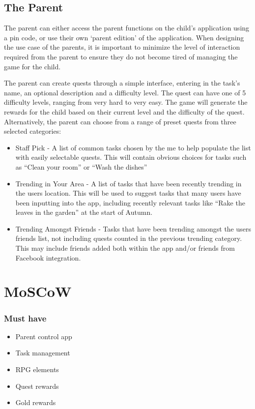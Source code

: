 \subsection{The Parent}
The parent can either access the parent functions on the child's application using a pin code, or use their own `parent edition' of the application. 
When designing the use case of the parents, it is important to minimize the level of interaction required from the parent to ensure they do not become tired of managing the game for the child.

The parent can create quests through a simple interface, entering in the task's name, an optional description and a difficulty level. 
The quest can have one of 5 difficulty levels, ranging from very hard to very easy.
The game will generate the rewards for the child based on their current level and the difficulty of the quest.
Alternatively, the parent can choose from a range of preset quests from three selected categories:
\begin{itemize}
	\item 
		Staff Pick - A list of common tasks chosen by the me to help populate the list with easily selectable quests. 
		This will contain obvious choices for tasks such as ``Clean your room'' or ``Wash the dishes''
	\item
		Trending in Your Area - A list of tasks that have been recently trending in the users location. 
		This will be used to suggest tasks that many users have been inputting into the app, including recently relevant tasks like ``Rake the leaves in the garden'' at the start of Autumn.
	\item 
		Trending Amongst Friends - Tasks that have been trending amongst the users friends list, not including quests counted in the previous 	trending category. 
		This may include friends added both within the app and/or friends from Facebook integration.  
\end{itemize}

\section{MoSCoW}

\subsubsection{Must have}
\begin{itemize}
	\item Parent control app
	\item Task management
	\item RPG elements
	\item Quest rewards
	\item Gold rewards
\end{itemize}

